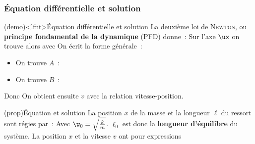 \documentclass[../../main/main.tex]{subfiles}
\begin{document}
\subsubsection{Équation différentielle et solution}

\begin{tcb}[label=demo:solreslibre, sidebyside, sidebyside align=top](demo)<lfnt>{Équation différentielle et solution}
	La deuxième loi de \textsc{Newton}, ou \textbf{principe fondamental de la
		dynamique} (PFD) donne~:
	Sur l'axe $\ux$ on trouve alors
	\psw{
		\[
			m \dv[2]{x}{t} + kx = 0 \Lra \boxed{\dv[2]{x}{t} + \w_0{}^{2}x = 0}
		\]
	}
	avec
	\psw{
		\[
			\w_0{}^{2} = \frac{k}{m} \Ra \boxed{\w_0 = \sqrt{\frac{k}{m}}}
		\]
	}
	\tcblower
	On écrit la forme générale~:
	\psw{
		\[
			x(t) = A\cos(\w_0 t) + B\sin(\w_0 t)
		\]
	}
	\vspace{-20pt}
	\begin{itemize}
		\item On trouve $A$~:
		      \psw{
			      \[
				      x(0) = A
				      \qet
				      x(0) = x_0
				      \quad \Ra \boxed{A = x_0}
			      \]
		      }
		      \vspace{-15pt}
		\item On trouve $B$~:
		      \vspace{-15pt}
	\end{itemize}
	Donc
	\psw{
		\[
			\boxed{x (t) = x_0\cos(\w_0t)}
		\]
	}
	On obtient ensuite $v$ avec la relation vitesse-position.
\end{tcb}
\begin{tcb}[label=prop:eqdiffreslibre, sidebyside, righthand ratio=.4](prop){Équation et solution}
	La position $x$ de la masse et la longueur $\ell$ du ressort sont régies
	par~:
	Avec $\w_0 = \sqrt{\frac{k}{m}}$.
	\smallbreak
	$\ell_0$ est donc la \textbf{longueur d'équilibre} du système.
	\tcblower
	La position $x$ et la vitesse $v$ ont pour expressions
\end{tcb}
\end{document}
